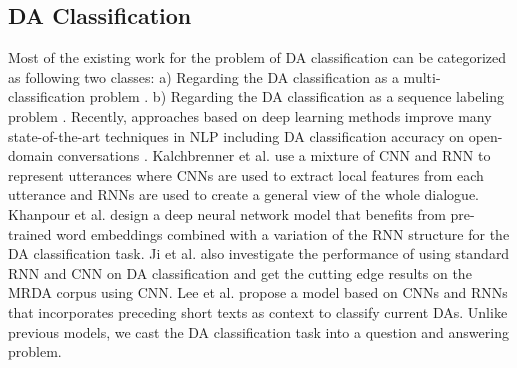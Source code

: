\documentclass[conference]{IEEEtran}
\begin{document}
	\subsection{DA Classification}
	Most of the existing work for the problem of DA classification can be categorized as following two classes: a) Regarding the DA classification as a multi-classification problem \cite{reithinger1997dialogue,geertzen2007multidimensional}. %
	b) Regarding the DA classification as a sequence labeling problem \cite{surendran2006dialog}.%
	Recently, approaches based on deep learning methods improve many state-of-the-art techniques in NLP including DA classification accuracy on open-domain conversations \cite{kalchbrenner2013recurrent,khanpour2016dialogue,ji2016latent,lee2016sequential}. Kalchbrenner et al. \cite{kalchbrenner2013recurrent} use a mixture of CNN and RNN to represent utterances where CNNs are used to extract local features from each utterance and RNNs are used to create a general view of the whole dialogue. Khanpour et al. \cite{khanpour2016dialogue} design a deep neural network model that benefits from pre-trained word embeddings combined with a variation of the RNN structure for the DA classification task. Ji et al. \cite{ji2016latent} also investigate the performance of using standard RNN and CNN on DA classification and get the cutting edge results on the MRDA corpus using CNN. Lee et al. \cite{lee2016sequential} propose a model based on CNNs and RNNs that incorporates preceding short texts as context to classify current DAs. Unlike previous models, we cast the DA classification task into a question and answering problem.
	
\end{document}
